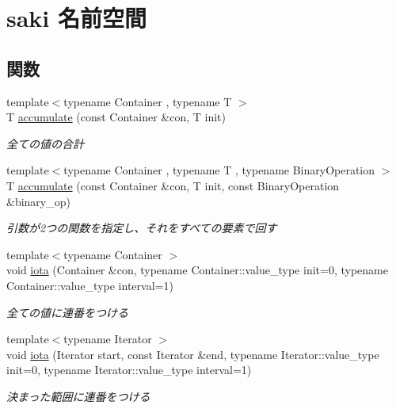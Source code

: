 \hypertarget{namespacesaki}{}\section{saki 名前空間}
\label{namespacesaki}
\subsection*{関数}
\begin{DoxyCompactItemize}
\item 
{\footnotesize template$<$typename Container , typename T $>$ }\\T \mbox{\hyperlink{namespacesaki_a0f9963378e1e25eb379f002fc2675544}{accumulate}} (const Container \&con, T init)
\begin{DoxyCompactList}\small\item\em 全ての値の合計 \end{DoxyCompactList}\item 
{\footnotesize template$<$typename Container , typename T , typename Binary\+Operation $>$ }\\T \mbox{\hyperlink{namespacesaki_a8ecf606c3b0a7c7448938838e528de7b}{accumulate}} (const Container \&con, T init, const Binary\+Operation \&binary\+\_\+op)
\begin{DoxyCompactList}\small\item\em 引数が2つの関数を指定し、それをすべての要素で回す \end{DoxyCompactList}\item 
{\footnotesize template$<$typename Container $>$ }\\void \mbox{\hyperlink{namespacesaki_a09fe69a84525eaaec6ad1d377c23c027}{iota}} (Container \&con, typename Container\+::value\+\_\+type init=0, typename Container\+::value\+\_\+type interval=1)
\begin{DoxyCompactList}\small\item\em 全ての値に連番をつける \end{DoxyCompactList}\item 
{\footnotesize template$<$typename Iterator $>$ }\\void \mbox{\hyperlink{namespacesaki_a60fc6028a57a55dcc37d01458997f7e3}{iota}} (Iterator start, const Iterator \&end, typename Iterator\+::value\+\_\+type init=0, typename Iterator\+::value\+\_\+type interval=1)
\begin{DoxyCompactList}\small\item\em 決まった範囲に連番をつける \end{DoxyCompactList}\end{DoxyCompactItemize}


